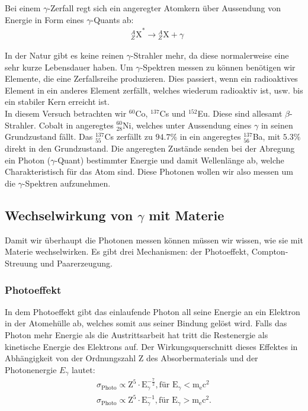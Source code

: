 \documentclass[12pt,a4paper,titlepage]{article}
\begin{document}
\indent Bei einem $\gamma$-Zerfall regt sich ein angeregter Atomkern über Aussendung von Energie in Form eines $\gamma$-Quants ab:
\begin{align}
& {^A_Z\text{X}}^* \rightarrow {^A_Z\text{X}} + \gamma
\end{align}

\indent In der Natur gibt es keine reinen $\gamma$-Strahler mehr, da diese normalerweise eine sehr kurze Lebensdauer haben. Um $\gamma$-Spektren messen zu können benötigen wir Elemente, die eine Zerfallsreihe produzieren. Dies passiert, wenn ein radioaktives Element in ein anderes Element zerfällt, welches wiederum radioaktiv ist, usw. bis ein stabiler Kern erreicht ist.\\

\indent In diesem Versuch betrachten wir $^{60}$Co, $^{137}$Cs und $^{152}$Eu. Diese sind allesamt $\beta$-Strahler. Cobalt in angeregtes $^{60}_{28}$Ni, welches unter Aussendung eines $\gamma$ in seinen Grundzustand fällt. Das $^{137}_{55}$Cs zerfällt zu $94.7\%$ in ein angeregtes $^{137}_{56}$Ba, mit $5.3\%$ direkt in den Grundzustand. Die angeregten Zustände senden bei der Abregung ein Photon ($\gamma$-Quant) bestimmter Energie und damit Wellenlänge ab, welche Charakteristisch für das Atom sind. Diese Photonen wollen wir also messen um die $\gamma$-Spektren aufzunehmen.

\subsection{Wechselwirkung von $\gamma$ mit Materie}

\noindent Damit wir überhaupt die Photonen messen können müssen wir wissen, wie sie mit Materie wechselwirken. Es gibt drei Mechanismen: der Photoeffekt, Compton-Streuung und Paarerzeugung. \\

\subsubsection{Photoeffekt}

\noindent In dem Photoeffekt gibt das einlaufende Photon all seine Energie an ein Elektron in der Atomehülle ab, welches somit aus seiner Bindung gelöst wird. Falls das Photon mehr Energie als die Austrittsarbeit hat tritt die Restenergie als kinetische Energie des Elektrons auf. Der Wirkungsquerschnitt dieses Effektes in Abhängigkeit von der Ordnungszahl Z des Absorbermaterials und der Photonenergie $E_\gamma$ lautet:
\begin{align}
\sigma_{\text{Photo}} \propto \text{Z}^5 \cdot \text{E}^{-\frac{7}{2}}_\gamma, \text{für } \text{E}_\gamma < \text{m}_\text{e}\text{c}^2\\
\sigma_{\text{Photo}} \propto \text{Z}^5 \cdot \text{E}^{-1}_\gamma, \text{für } \text{E}_\gamma > \text{m}_\text{e}\text{c}^2.
\end{align}
\end{document}
